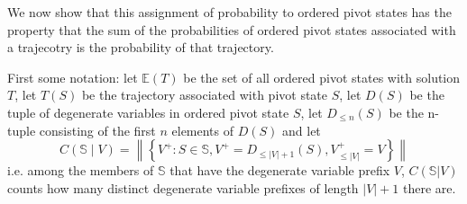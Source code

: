 We now show that this assignment of probability to ordered pivot states has the property that the sum of the probabilities of ordered pivot states associated with a trajecotry is the probability of that trajectory.

First some notation: let $\mathbb{E}(T)$ be the set of all ordered pivot states with solution $T$, let $T(S)$ be the trajectory associated with pivot state $S$, let $D(S)$ be the tuple of degenerate variables in ordered pivot state $S$, let $D_{\le n}(S)$ be the n-tuple consisting of the first $n$ elements of $D(S)$ and let
\begin{equation}
C(\mathbb{S} \mid V) = \left\|\left\{ V^+ :  S \in \mathbb{S}, V^+ = D_{\le |V|+1}(S), V^+_{\le |V|}=V \right\}\right\|
\label{count}
\end{equation}
i.e. among the members of $\mathbb{S}$ that have the degenerate variable prefix $V$, $C(\mathbb{S}|V)$ counts how many distinct degenerate variable prefixes of length $|V|+1$ there are.




